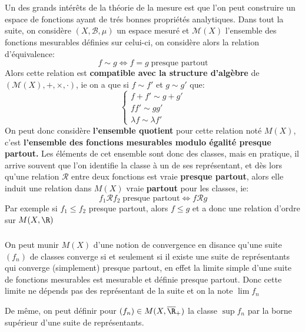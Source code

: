 \chapter*{} %
Un des grands intérêts de la théorie de la mesure est que l'on peut construire un espace de fonctions ayant de trés bonnes propriétés analytiques. Dans tout la suite, on considère \( (X, \mathcal{B}, \mu) \) un espace mesuré et \( \mathcal{M}(X) \) l'ensemble des fonctions mesurables définies sur celui-ci, on considère alors la relation d'équivalence:
\[ 
   f \sim g \iff f = g \; \text{presque partout}
\]
Alors cette relation est \textbf{compatible avec la structure d'algèbre} de \( (\mathcal{M}(X), +, \times, \cdot) \), ie on a que si \( f \sim f' \) et \( g \sim g' \) que:
\[ 
   \begin{cases}
      f+f' \sim g+g'\\
      ff' \sim gg'\\
      \lambda f\sim \lambda f'
   \end{cases}
\]
On peut donc considère \textbf{l'ensemble quotient} pour cette relation noté \( M(X) \), c'est \textbf{l'ensemble des fonctions mesurables modulo égalité presque partout.} Les éléments de cet ensemble sont donc des classes, mais en pratique, il arrive souvent que l'on identifie la classe à un de ses représentant, et dès lors qu'une relation \( \mathcal{R} \) entre deux fonctions est vraie \textbf{presque partout}, alors elle induit une relation dans \( M(X) \) vraie \textbf{partout} pour les classes, ie:
\[ 
   f_1 \mathcal{R} f_2 \; \text{presque partout} \iff f \mathcal{R} g 
\]
Par exemple si \( f_1 \leq f_2 \) presque partout, alors \( f \leq g \) et  a donc une relation d'ordre sur \( M(X, \R) \)
\subsection*{}
On peut munir \( M(X) \) d'une notion de convergence en disance qu'une suite \( (f_n) \) de classes converge si et seulement si il existe une suite de représentants qui converge (simplement) presque partout, en effet la limite simple d'une suite de fonctions mesurables est mesurable et définie presque partout. Donc cette limite ne dépends pas des représentant de la suite et on la note \( \lim f_n \)\<

De même, on peut définir pour \( (f_n) \in M(X, \overline{\R}_+) \) la classe \( \sup f_n \) par la borne supérieur d'une suite de représentants.
